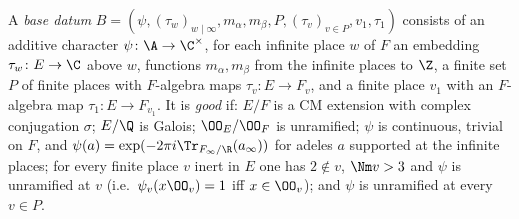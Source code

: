 \begin{definition}\label{pf:thmK:def:base}
A \emph{base datum} $B=(\psi,(\tau_w)_{w\mid\infty},m_\alpha,m_\beta,P,(\tau_v)_{v\in P},v_1,\tau_1)$ consists of an
additive character $\psi\colon\A\to\C^\times$, for each infinite place $w$ of $F$ an embedding $\tau_w\colon E\to\C$
above $w$, functions $m_\alpha,m_\beta$ from the infinite places to $\Z$, a finite set $P$ of finite places with
$F$-algebra maps $\tau_v\colon E\to F_v$, and a finite place $v_1$ with an $F$-algebra map $\tau_1\colon E\to F_{v_1}$.
It is \emph{good} if: $E/F$ is a CM extension with complex conjugation $\sigma$; $E/\Q$ is Galois; $\OO_E/\OO_F$ is
unramified; $\psi$ is continuous, trivial on $F$, and $\psi(a)=\exp(-2\pi i\Tr_{F_\infty/\R}(a_\infty))$ for adeles $a$
supported at the infinite places; for every finite place $v$ inert in $E$ one has $2\notin v$, $\Nm v>3$ and $\psi$ is
unramified at $v$ (i.e.\ $\psi_v(x\OO_v)=1$ iff $x\in\OO_v$); and $\psi$ is unramified at every $v\in P$.
\end{definition}

